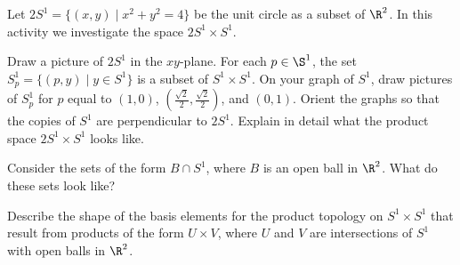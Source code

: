 \begin{activity} Let $2S^1 = \{(x,y) \mid x^2 + y^2 = 4\}$ be the unit circle as a subset of $\R^2$. In this activity we investigate the space $2S^1 \times  S^1$.  
\ba
\item Draw a picture of $2S^1$ in the $xy$-plane. For each $p \in \S^1$, the set $S^1_p = \{(p, y) \mid y \in S^1\}$ is a subset of $S^1 \times S^1$. On your graph of $S^1$, draw pictures of $S^1_p$ for $p$ equal to $(1,0)$, $\left(\frac{\sqrt{2}}{2}, \frac{\sqrt{2}}{2}\right)$, and $(0,1)$. Orient the graphs so that the copies of $S^1$ are perpendicular to $2S^1$. Explain in detail what the product space $2S^1 \times S^1$ looks like. 

\item Consider the sets of the form $B \cap S^1$, where $B$ is an open ball in $\R^2$. What do these sets look like?

\item Describe the shape of the basis elements for the product topology on $S^1 \times S^1$ that result from products of the form $U \times V$, where $U$ and $V$ are intersections of $S^1$ with open balls in $\R^2$. 

\ea

\end{activity}

